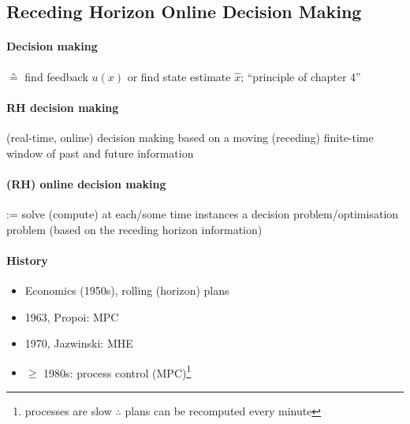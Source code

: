 \subsection{Receding Horizon Online Decision Making}

\paragraph{Decision making} $\corresponds$ find feedback $u(x)$ or find state estimate $\hat{x}$; ``principle of chapter 4''

\paragraph{RH decision making}
(real-time, online) decision making based on a moving (receding) finite-time window of past and future information

\begin{figure}[H]
    \centering
    \def\svgwidth{\columnwidth}
    { \footnotesize
    
    }
\end{figure}

\paragraph{(RH) online decision making}
:= solve (compute) at each/some time instances a decision problem/optimisation problem (based on the receding horizon information)

\paragraph{History}
\begin{itemize}
    \item Economics (1950s), rolling (horizon) plans
    \item 1963, Propoi: MPC
    \item 1970, Jazwinski: MHE
    \item $\geq$ 1980s: process control (MPC)\footnote{processes are slow $\therefore$ plans can be recomputed every minute}
\end{itemize}